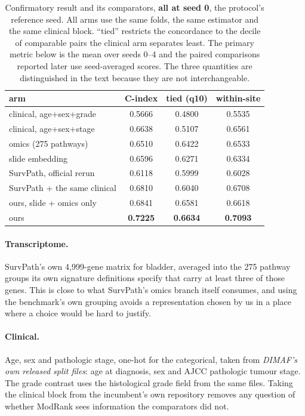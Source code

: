 \documentclass[unnumsec,webpdf,contemporary,large]{oup-authoring-template}
\begin{document}
\begin{table}[t]
\centering
\caption{Confirmatory result and its comparators, \textbf{all at seed 0}, the protocol's reference
seed. All arms use the same folds, the same estimator and the same clinical block. ``tied''
restricts the concordance to the decile of comparable pairs the clinical arm separates least. The
primary metric below is the mean over seeds 0--4 and the paired comparisons reported later use
seed-averaged scores. The three quantities are distinguished in the text because they are not
interchangeable.}
\label{tab:main}
\begin{tabular}{lccc}
\toprule
arm & C-index & tied (q10) & within-site \\
\midrule
clinical, age+sex+grade   & 0.5666 & 0.4800 & 0.5535 \\
clinical, age+sex+stage   & 0.6638 & 0.5107 & 0.6561 \\
omics (275 pathways)               & 0.6510 & 0.6422 & 0.6533 \\
slide embedding                    & 0.6596 & 0.6271 & 0.6334 \\
SurvPath, official rerun           & 0.6118 & 0.5999 & 0.6028 \\
SurvPath + the same clinical       & 0.6810 & 0.6040 & 0.6708 \\
ours, slide + omics only           & 0.6841 & 0.6581 & 0.6618 \\
ours                      & \textbf{0.7225} & \textbf{0.6634} & \textbf{0.7093} \\
\bottomrule
\end{tabular}
\end{table}

\paragraph{Transcriptome.} SurvPath's own 4{,}999-gene matrix for bladder, averaged into the 275 pathway groups its own
signature definitions specify that carry at least three of those genes.
This is close to what SurvPath's omics branch itself consumes, and using the benchmark's own
grouping avoids a representation chosen by us in a place where a choice would be hard to justify.

\paragraph{Clinical.} Age, sex and pathologic stage, one-hot for the categorical, taken from
\emph{DIMAF's own released split files}: age at diagnosis, sex and
AJCC pathologic tumour stage. The grade contrast uses the histological grade field from
the same files. Taking the clinical block from the incumbent's own repository removes any question
of whether ModRank sees information the comparators did not.
\end{document}
